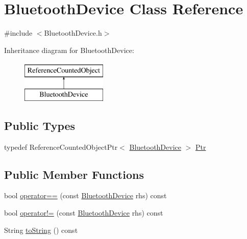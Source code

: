 \hypertarget{classBluetoothDevice}{}\section{Bluetooth\+Device Class Reference}
\label{classBluetoothDevice}


{\ttfamily \#include $<$Bluetooth\+Device.\+h$>$}

Inheritance diagram for Bluetooth\+Device\+:\begin{figure}[H]
\begin{center}
\leavevmode
\includegraphics[height=2.000000cm]{classBluetoothDevice}
\end{center}
\end{figure}
\subsection*{Public Types}
\begin{DoxyCompactItemize}
\item 
typedef Reference\+Counted\+Object\+Ptr$<$ \mbox{\hyperlink{classBluetoothDevice}{Bluetooth\+Device}} $>$ \mbox{\hyperlink{classBluetoothDevice_a09533a65feced122f347c2b676c4e74a}{Ptr}}
\end{DoxyCompactItemize}
\subsection*{Public Member Functions}
\begin{DoxyCompactItemize}
\item 
bool \mbox{\hyperlink{classBluetoothDevice_a60bf6c940fd9681fc0dc1b2832b83e70}{operator==}} (const \mbox{\hyperlink{classBluetoothDevice}{Bluetooth\+Device}} rhs) const
\item 
bool \mbox{\hyperlink{classBluetoothDevice_a4e5b8d76461d72ebc4689d6b9abd1bd7}{operator!=}} (const \mbox{\hyperlink{classBluetoothDevice}{Bluetooth\+Device}} rhs) const
\item 
String \mbox{\hyperlink{classBluetoothDevice_aa3c9706edd92d58d097ef56d78c59099}{to\+String}} () const
\end{DoxyCompactItemize}
